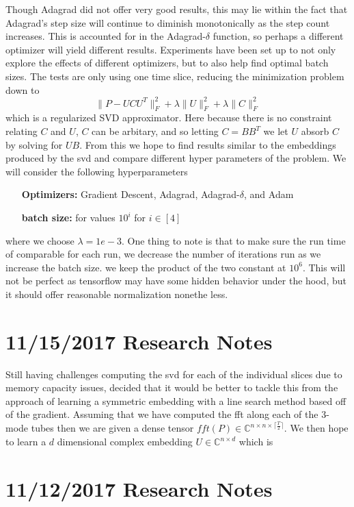 \documentclass{report}
\newcommand{\ceil}[1]{\lceil #1 \rceil}
\begin{document}
	   Though Adagrad did not offer very good results, this may lie within the fact that Adagrad's step size will continue to diminish monotonically as the step count increases. This is accounted for in the Adagrad-$ \delta $ function, so perhaps a different optimizer will yield different results. Experiments have been set up to not only explore the effects of different optimizers, but to also help find optimal batch sizes. The tests are only using one time slice, reducing the minimization problem down to 
	   \[ \|P - UCU^T\|_F^2 + \lambda\|U\|_F^2 + \lambda\|C\|_F^2 \]
	   which is a regularized SVD approximator. Here because there is no constraint relating  $ C $ and $ U $, $ C $ can be arbitary, and so letting $ C = BB^T $ we let $ U $ absorb $ C $ by solving for $ UB $. From this we hope to find results similar to the embeddings produced by the svd and compare different hyper parameters of the problem. 
	   We will consider the following hyperparameters 
	   \begin{enumerate}
	   	 \item[\textbf{Optimizers:}] Gradient Descent, Adagrad, Adagrad-$ \delta $, and Adam
	   	 \item[\textbf{batch size:}] for values $ 10^i$ for $ i \in [4] $
	   \end{enumerate}
	   where we choose $ \lambda = 1e-3 $. One thing to note is that to make sure the run time of comparable for each run, we decrease the number of iterations run as we increase the batch size. we keep the product of the two constant at $ 10^6 $. This will not be perfect as tensorflow may have some hidden behavior under the hood, but it should offer reasonable normalization nonethe less. 
	   
		\section{11/15/2017 Research Notes}
	  Still having challenges computing the svd for each of the individual slices due to memory capacity issues, decided that it would be better to tackle this from the approach of learning a symmetric embedding with a line search method based off of the gradient. Assuming that we have computed the fft along each of the 3-mode tubes then we are given a dense tensor $ fft(P) \in \mathbb{C}^{n \times n \times \ceil{\frac{T}{2}}} $. We then hope to learn a $ d $ dimensional complex embedding $ U \in \mathbb{C}^{n \times d} $ which is 
	  
	 
	
	\section{11/12/2017 Research Notes}
\end{document}
